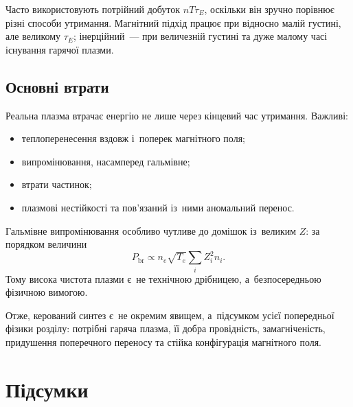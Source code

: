 Часто використовують потрійний добуток $nT\tau_E$, оскільки він зручно порівнює різні
способи утримання. Магнітний підхід працює при відносно малій густині, але великому
$\tau_E$; інерційний~--- при величезній густині та дуже малому часі існування гарячої
плазми.



\subsection*{Основні втрати}



Реальна плазма втрачає енергію не лише через кінцевий час утримання. Важливі:
\begin{itemize}
	\item теплоперенесення вздовж і~поперек магнітного поля;
	\item випромінювання, насамперед гальмівне;
	\item втрати частинок;
	\item плазмові нестійкості та пов'язаний із~ними аномальний перенос.
\end{itemize}

Гальмівне випромінювання особливо чутливе до домішок із~великим $Z$: за порядком величини
\begin{equation*}
	P_{\mathrm{br}}\propto n_e\sqrt{T_e}\sum_i Z_i^2n_i.
\end{equation*}
Тому висока чистота плазми є~не технічною дрібницею, а~безпосередньою фізичною вимогою.

Отже, керований синтез є~не окремим явищем, а~підсумком усієї попередньої фізики розділу:
потрібні гаряча плазма, її добра провідність, замагніченість, придушення поперечного
переносу та стійка конфігурація магнітного поля.

\section*{Підсумки}

